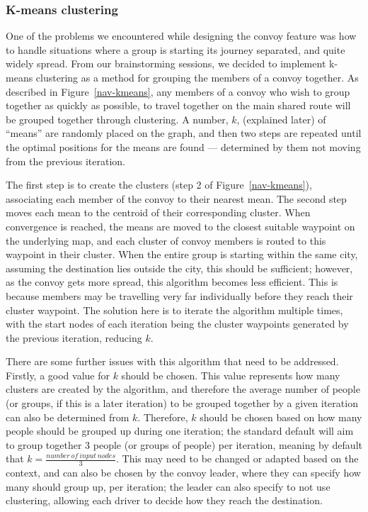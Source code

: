 \documentclass{article}
\begin{document}
\subsubsection{K-means clustering}\label{sssec:nav-tech-kmeans}
One of the problems we encountered while designing the convoy feature was how to handle situations where a group is starting its journey separated, and quite widely spread. From our brainstorming sessions, we decided to implement k-means clustering as a method for grouping the members of a convoy together. As described in Figure~\ref{nav-kmeans}, any members of a convoy who wish to group together as quickly as possible, to travel together on the main shared route will be grouped together through clustering. A number, $k$, (explained later) of ``means'' are randomly placed on the graph, and then two steps are repeated until the optimal positions for the means are found --- determined by them not moving from the previous iteration.

The first step is to create the clusters (step 2 of Figure~\ref{nav-kmeans}), associating each member of the convoy to their nearest mean. The second step moves each mean to the centroid of their corresponding cluster. When convergence is reached, the means are moved to the closest suitable waypoint on the underlying map, and each cluster of convoy members is routed to this waypoint in their cluster. When the entire group is starting within the same city, assuming the destination lies outside the city, this should be sufficient; however, as the convoy gets more spread, this algorithm becomes less efficient. This is because members may be travelling very far individually before they reach their cluster waypoint. The solution here is to iterate the algorithm multiple times, with the start nodes of each iteration being the cluster waypoints generated by the previous iteration, reducing $k$.

There are some further issues with this algorithm that need to be addressed. Firstly, a good value for $k$ should be chosen. This value represents how many clusters are created by the algorithm, and therefore the average number of people (or groups, if this is a later iteration) to be grouped together by a given iteration can also be determined from $k$. Therefore, $k$ should be chosen based on how many people should be grouped up during one iteration; the standard default will aim to group together 3
%
%
people (or groups of people) per iteration, meaning by default that $k=\frac{number\ of\ input\ nodes}{3}$. This may need to be changed or adapted based on the context, and can also be chosen by the convoy leader, where they can specify how many should group up, per iteration; the leader can also specify to not use clustering, allowing each driver to decide how they reach the destination.
\end{document}
